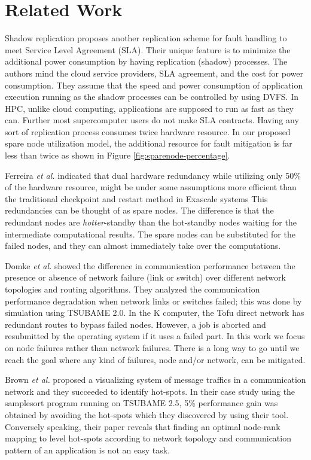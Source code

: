 \documentclass[Afour,times,sageh]{sagej}
\begin{document}
\section{Related Work}\label{sec:related-work}

Shadow replication proposes another replication scheme
for fault handling to meet Service Level Agreement
(SLA)\citep{6785308}. Their unique feature is to minimize the
additional power consumption by having replication (shadow)
processes. The authors mind the cloud service providers, SLA
agreement, and the cost for power consumption. They assume that the
speed and power consumption of application execution running as the
shadow processes can be controlled by using DVFS. In HPC, unlike cloud
computing, applications are supposed to run as fast as they
can. Further most supercomputer users do not make
SLA contracts. Having any sort of replication process consumes twice
hardware resource.  In our proposed spare node utilization model, the
additional resource for fault mitigation is far less than twice as
shown in Figure \ref{fig:sparenode-percentage}.

Ferreira {\it et al.} indicated that dual hardware redundancy while
utilizing only 50\% of the hardware resource, might be under some
assumptions more efficient than the traditional checkpoint and restart
method in Exascale systems This redundancies can be thought of as
spare nodes. The difference is that the redundant nodes are {\it
  hotter}-standby than the hot-standby nodes waiting for the
intermediate computational results. The spare nodes can be substituted
for the failed nodes, and they can almost immediately take over the
computations.

Domke {\it et al.} showed the difference in communication performance
between the presence or absence of network failure (link or switch)
over different network topologies and routing
algorithms\citep{Domke:2014:FND:2683593.2683659}. They analyzed the
communication performance degradation when network links or switches
failed; this was done by simulation using TSUBAME 2.0. In the K
computer, the Tofu direct network has redundant routes to bypass
failed nodes. However, a job is aborted and resubmitted by the
operating system if it uses a failed part. In this work we focus on
node failures rather than network failures. There is a
long way to go until we reach the goal where any kind of failures,
node and/or network, can be mitigated.

Brown {\it et al.} proposed a visualizing system of message traffics
in a communication network\citep{7384355} and they succeeded to
identify hot-spots. In their case study using the samplesort program
running on TSUBAME 2.5, 5\% performance gain was obtained by avoiding
the hot-spots which they discovered by using their tool. Conversely
speaking, their paper reveals that finding an optimal node-rank
mapping to level hot-spots according to network topology and
communication pattern of an application is not an easy task.
\end{document}
